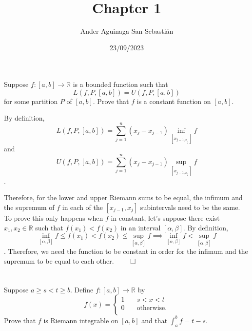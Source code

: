 \documentclass[11pt, a4paper, tikz]{article}
\newcommand{\newpara}{
	\vskip 2mm
}
\newcommand{\centsection}[1]{
	\section*{\centering{#1}}
}
\begin{document}
	\title{\textbf{Chapter 1}}
	\author{Ander Aguinaga San Sebastián}
	\date{23/09/2023}
	\maketitle
	\centsection{Exercise 1}
	
	\begin{formulationBox}
		Suppose $f:[a,b]\rightarrow\mathbb{R}$ is a bounded function such that \[L(f,P,[a,b]) = U(f,P,[a,b])\] for some partition $P$ of $[a,b]$. Prove that $f$ is a constant function on $[a,b]$.
	\end{formulationBox}
	
	By definition,
	\begin{equation*}
		L(f, P, [a, b]) = \sum_{j=1}^{n}(x_j-x_{j-1})\inf_{[x_{j-1,x_j}]}f
	\end{equation*}
	and
		\begin{equation*}
		U(f, P, [a, b]) = \sum_{j=1}^{n}(x_j-x_{j-1})\sup_{[x_{j-1,x_j}]}f
	\end{equation*}
	.
	\newpara
	Therefore, for the lower and upper Riemann sums to be equal, the infimum and the supremum of $f$ in each of the $[x_{j-1},x_j]$ subintervals need to be the same. To prove this only happens when $f$ in constant, let's suppose there exist $x_1, x_2\in\mathbb{R}$ such that $f(x_1) < f(x_2)$ in an interval $[\alpha,\beta]$. By definition,
	\begin{equation*}
		\inf_{[\alpha,\beta]}f \leq f(x_1) < f(x_2) \leq  \sup_{[\alpha,\beta]}f \implies \inf_{[\alpha,\beta]}f < \sup_{[\alpha,\beta]}f
	\end{equation*}. Therefore, we need the function to be constant in order for the infimum and the supremum to be equal to each other.
	$\qed$
	
	\centsection{Exercise 2}
	
	\begin{formulationBox}
		Suppose $a\geq s<t\geq b$. Define $f:[a,b]\rightarrow\mathbb{R}$ by
		\[
			f(x) =
			\begin{cases}
				1 &\quad s<x<t\\
				0 &\quad \textrm{otherwise.}\\ 
			\end{cases}
		\]
		Prove that $f$ is Riemann integrable on $[a,b]$ and that $\int_a^bf=t-s$.
	\end{formulationBox}
	
\end{document}
